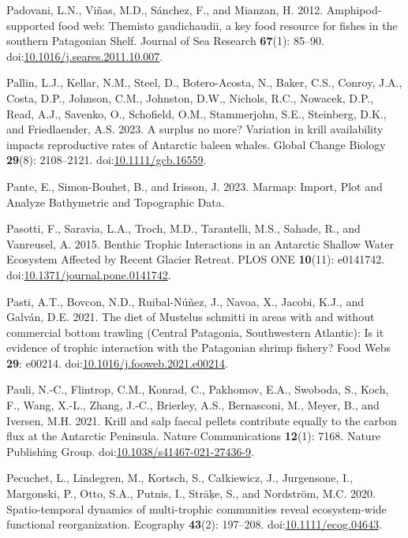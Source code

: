 \documentclass[
]{article}
\newlength{\cslhangindent}
\newenvironment{CSLReferences}[2] %
 {\begin{list}{}{%
  \setlength{\itemindent}{0pt}
  \setlength{\leftmargin}{0pt}
  \setlength{\parsep}{0pt}
  \ifodd #1
   \setlength{\leftmargin}{\cslhangindent}
   \setlength{\itemindent}{-1\cslhangindent}
  \fi
  \setlength{\itemsep}{#2\baselineskip}}}
 {\end{list}}
\begin{document}
\begin{CSLReferences}{1}{0}
Padovani, L.N., Viñas, M.D., Sánchez, F., and Mianzan, H. 2012.
Amphipod-supported food web: {Themisto} gaudichaudii, a key food
resource for fishes in the southern {Patagonian Shelf}. Journal of Sea
Research \textbf{67}(1): 85--90.
doi:\href{https://doi.org/10.1016/j.seares.2011.10.007}{10.1016/j.seares.2011.10.007}.

Pallin, L.J., Kellar, N.M., Steel, D., Botero-Acosta, N., Baker, C.S.,
Conroy, J.A., Costa, D.P., Johnson, C.M., Johnston, D.W., Nichols, R.C.,
Nowacek, D.P., Read, A.J., Savenko, O., Schofield, O.M., Stammerjohn,
S.E., Steinberg, D.K., and Friedlaender, A.S. 2023. A surplus no more?
{Variation} in krill availability impacts reproductive rates of
{Antarctic} baleen whales. Global Change Biology \textbf{29}(8):
2108--2121.
doi:\href{https://doi.org/10.1111/gcb.16559}{10.1111/gcb.16559}.

Pante, E., Simon-Bouhet, B., and Irisson, J. 2023. Marmap: {Import},
{Plot} and {Analyze Bathymetric} and {Topographic Data}.

Pasotti, F., Saravia, L.A., Troch, M.D., Tarantelli, M.S., Sahade, R.,
and Vanreusel, A. 2015. Benthic {Trophic Interactions} in an {Antarctic
Shallow Water Ecosystem Affected} by {Recent Glacier Retreat}. PLOS ONE
\textbf{10}(11): e0141742.
doi:\href{https://doi.org/10.1371/journal.pone.0141742}{10.1371/journal.pone.0141742}.

Pasti, A.T., Bovcon, N.D., Ruibal-Núñez, J., Navoa, X., Jacobi, K.J.,
and Galván, D.E. 2021. The diet of {Mustelus} schmitti in areas with and
without commercial bottom trawling ({Central Patagonia}, {Southwestern
Atlantic}): {Is} it evidence of trophic interaction with the
{Patagonian} shrimp fishery? Food Webs \textbf{29}: e00214.
doi:\href{https://doi.org/10.1016/j.fooweb.2021.e00214}{10.1016/j.fooweb.2021.e00214}.

Pauli, N.-C., Flintrop, C.M., Konrad, C., Pakhomov, E.A., Swoboda, S.,
Koch, F., Wang, X.-L., Zhang, J.-C., Brierley, A.S., Bernasconi, M.,
Meyer, B., and Iversen, M.H. 2021. Krill and salp faecal pellets
contribute equally to the carbon flux at the {Antarctic Peninsula}.
Nature Communications \textbf{12}(1): 7168. Nature Publishing Group.
doi:\href{https://doi.org/10.1038/s41467-021-27436-9}{10.1038/s41467-021-27436-9}.

Pecuchet, L., Lindegren, M., Kortsch, S., Całkiewicz, J., Jurgensone,
I., Margonski, P., Otto, S.A., Putnis, I., Strāķe, S., and Nordström,
M.C. 2020. Spatio-temporal dynamics of multi-trophic communities reveal
ecosystem-wide functional reorganization. Ecography \textbf{43}(2):
197--208.
doi:\href{https://doi.org/10.1111/ecog.04643}{10.1111/ecog.04643}.


\end{CSLReferences}
\end{document}
